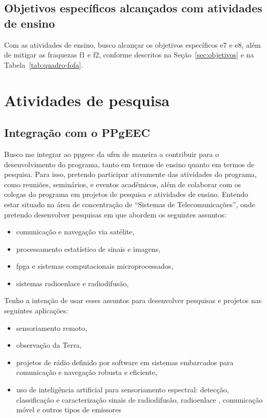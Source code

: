 \documentclass{article}
\begin{document}
\subsection{Objetivos específicos alcançados com atividades de ensino}

Com as atividades de ensino, busco alcançar os objetivos específicos e7 e e8, além de mitigar as fraquezas f1 e f2, conforme descritos na Seção~\ref{sec:objetivos} e na Tabela~\ref{tab:quadro-fofa}.

\section{Atividades de pesquisa}

\subsection{Integração com o PPgEEC}

Busco me integrar ao \gls{ppgeec} da \gls{ufrn} de maneira a contribuir para o desenvolvimento do programa, tanto em termos de ensino quanto em termos de pesquisa. Para isso, pretendo participar ativamente das atividades do programa, como reuniões, seminários, e eventos acadêmicos, além de colaborar com os colegas do programa em projetos de pesquisa e atividades de ensino. Entendo estar situado na área de concentração de ``Sistemas de Telecomunicações'', onde pretendo desenvolver pesquisas em que abordem os seguintes assuntos:
\begin{itemize}
    \item comunicação e navegação via satélite,
    \item processamento estatístico de sinais e imagens,
    \item \Gls{fpga} e sistemas computacionais microprocessados,
    \item sistemas radioenlace e radiodifusão, %
\end{itemize}
Tenho a intenção de usar esses assuntos para desenvolver pesquisas e projetos nas seguintes aplicações:
\begin{itemize}
    \item sensoriamento remoto,
    \item observação da Terra,
    \item projetos de rádio definido por software em sistemas embarcados para comunicação e navegação robusta e eficiente,
    \item uso de inteligência artificial para sensoriamento espectral: detecção, classificação e caracterização sinais de radiodifusão, radioenlace , comunicação móvel e outros tipos de emissores
\end{itemize}
\end{document}
